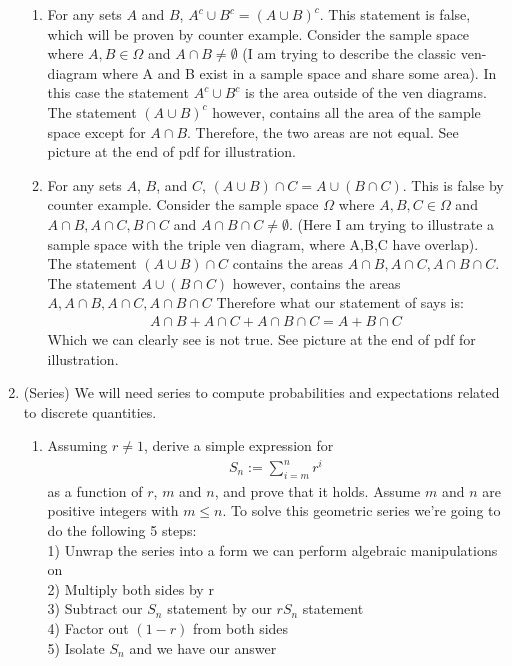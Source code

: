 \documentclass[12pt,twoside]{article}
\begin{document}
\begin{enumerate}
\begin{enumerate}
\item For any sets $A$ and $B$, $A^c \cup B^c = (A \cup B)^c$. 
\subitem This statement is false, which will be proven by counter example. Consider the sample space where $A,B \in \Omega$ and $A \cap B \neq \emptyset$ (I am trying to describe the classic ven-diagram where A and B exist in a sample space and share some area). In this case the statement $A^c \cup B^c$ is the area outside of the ven diagrams. The statement $(A \cup B)^c$ however, contains all the area of the sample space except for $A \cap B$. Therefore, the two areas are not equal. See picture at the end of pdf for illustration. 
\item For any sets $A$, $B$, and $C$, $(A \cup B) \cap C = A \cup (B \cap C)$. 
\subitem
This is false by counter example. Consider the sample space $\Omega$ where $A,B,C \in \Omega$ and $A\cap B, A\cap C, B\cap C$ and $A\cap B \cap C \neq \emptyset$. (Here I am trying to illustrate a sample space with the triple ven diagram, where A,B,C have overlap). The statement  $(A \cup B) \cap C$ contains the areas $A\cap B, A \cap C, A\cap B \cap C$. The statement $ A \cup (B \cap C)$ however, contains the areas $A, A\cap B, A\cap C, A\cap B \cap C$ Therefore what our statement of says is: 
\begin{equation}
    \begin{split}
        A\cap B + A\cap C + A\cap B \cap C = A + B \cap C
    \end{split}
\end{equation}
Which we can clearly see is not true. See picture at the end of pdf for illustration.
\end{enumerate}

\break
\item (Series) We will need series to compute probabilities and expectations related to discrete quantities. 
 \begin{enumerate}
\item  Assuming $r\neq 1$, derive a simple expression for
\begin{align}
S_n := \sum_{i=m}^{n} r^{i}
\end{align}
as a function of $r$, $m$ and $n$, and prove that it holds. Assume $m$
and $n$ are positive integers with $m\leq n$.
\subitem
To solve this geometric series we're going to do the following 5 steps: \\
1) Unwrap the series into a form we can perform algebraic manipulations on     \\
2) Multiply both sides by r \\
3) Subtract our $S_n$ statement by our $rS_n$ statement\\
4) Factor out $(1-r)$ from both sides \\
5) Isolate $S_n$ and we have our answer



\end{enumerate}
\end{enumerate}
\end{document}

